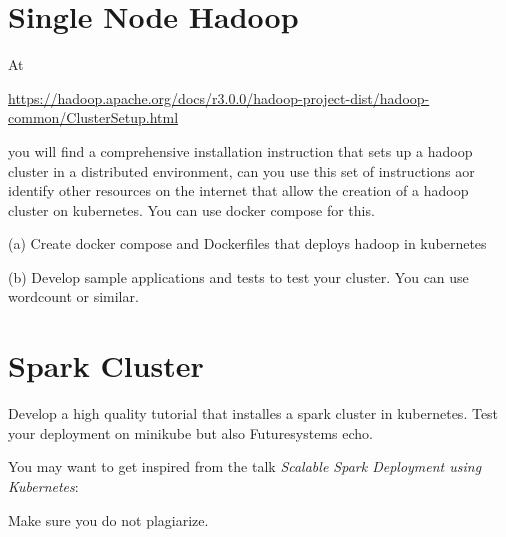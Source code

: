 \section{Single Node Hadoop}

\begin{exercise}

At

\url{https://hadoop.apache.org/docs/r3.0.0/hadoop-project-dist/hadoop-common/ClusterSetup.html}

you will find a comprehensive installation instruction that sets up a
hadoop cluster in a distributed environment, can you use this set of
instructions aor identify other resources on the internet that allow
the creation of a hadoop cluster on kubernetes. You can use docker
compose for this.


(a) Create docker compose and Dockerfiles that deploys hadoop in
kubernetes

(b) Develop sample applications and tests to test your cluster. You
can use wordcount or similar.

\end{exercise}



\section{Spark Cluster}

\begin{exercise}

Develop a high quality tutorial that installes a spark cluster in
kubernetes. Test your deployment on minikube but also Futuresystems
echo.

You may want to get inspired from the talk \textit{Scalable Spark
  Deployment using Kubernetes}:


Make sure you do not plagiarize.

\end{exercise}